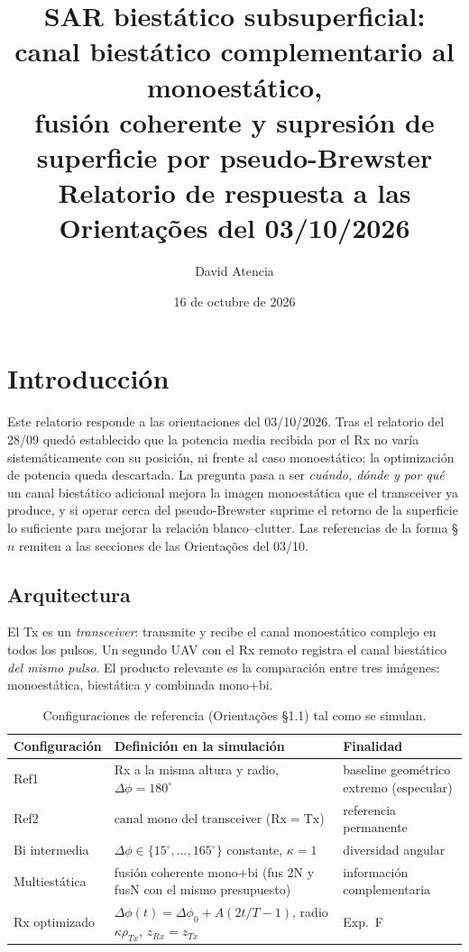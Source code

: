 \documentclass[11pt,a4paper]{report}
\title{\vspace{-1cm}\textbf{SAR biestático subsuperficial:\\
canal biestático complementario al monoestático,\\
fusión coherente y supresión de superficie por pseudo-Brewster}\\[10pt]
\large Relatorio de respuesta a las Orientações del 03/10/2026}
\author{David Atencia}
\date{16 de octubre de 2026}
\begin{document}
\sloppy
\maketitle



\tableofcontents



\chapter{Introducción}
\label{cap:intro}

Este relatorio responde a las orientaciones del 03/10/2026. Tras el
relatorio del 28/09 quedó establecido que la potencia media recibida por el Rx
no varía sistemáticamente con su posición, ni frente al caso monoestático; la
optimización de potencia queda descartada. La pregunta pasa a ser
\emph{cuándo, dónde y por qué} un canal biestático adicional mejora la imagen
monoestática que el transceiver ya produce, y si operar cerca del
pseudo-Brewster suprime el retorno de la superficie lo suficiente para mejorar
la relación blanco--clutter. Las referencias de la forma §$n$ remiten a las
secciones de las Orientações del 03/10.

\section{Arquitectura}

El Tx es un \emph{transceiver}: transmite y recibe el canal monoestático
complejo en todos los pulsos. Un segundo UAV con el Rx remoto registra el
canal biestático \emph{del mismo pulso}. El producto relevante es la
comparación entre tres imágenes: monoestática, biestática y combinada
mono+bi.

\begin{table}[H]
\centering\small
\caption{Configuraciones de referencia (Orientações §1.1) tal como se simulan.}
\label{tab:config}
\begin{tabular}{@{}L{3.0cm}L{6.0cm}L{5.3cm}@{}}
\toprule
\textbf{Configuración} & \textbf{Definición en la simulación} & \textbf{Finalidad} \\
\midrule
Ref1 & Rx a la misma altura y radio, $\Delta\phi=180^{\circ}$ & baseline geométrico extremo (especular) \\
Ref2 & canal mono del transceiver ($\mathrm{Rx}=\mathrm{Tx}$) & referencia permanente \\
Bi intermedia & $\Delta\phi\in\{15^{\circ},\dots,165^{\circ}\}$ constante, $\kappa=1$ & diversidad angular \\
Multiestática & fusión coherente mono+bi (fus 2N y fusN con el mismo presupuesto) & información complementaria \\
Rx optimizado & $\Delta\phi(t)=\Delta\phi_0+A(2t/T-1)$, radio $\kappa\rho_{Tx}$, $z_{Rx}=z_{Tx}$ & Exp.~F \\
\bottomrule
\end{tabular}
\end{table}
\end{document}
